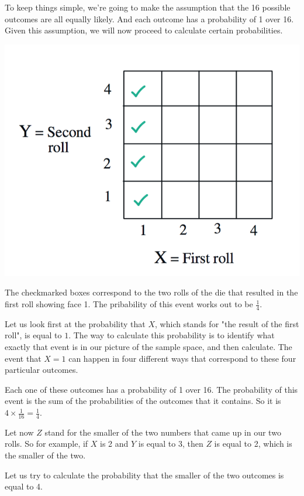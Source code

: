 \documentclass{tufte-handout}
\begin{document}
To keep things simple, we're going to make the assumption that the 16 possible outcomes are all
equally likely. And each outcome has a probability of 1 over 16. Given this assumption, we will now
proceed to calculate certain probabilities.

\begin{marginfigure}
  \includegraphics{CheckMarkedDie}
  \caption{The checkmarked boxes correspond to the two rolls of the die that resulted in the first roll showing face 1.  The pribability of this event works out to be $\frac{1}{4}.$}
\end{marginfigure}


Let us look first at the probability that $X$, which stands for "the result of the first roll", is equal to $1$. The way to
calculate this probability is to identify what exactly that event is in our picture of the sample space, and
then calculate. The event that $X = 1$ can happen in four different ways that correspond to these
four particular outcomes.

Each one of these outcomes has a probability of 1 over 16. The probability of this event is the sum of
the probabilities of the outcomes that it contains. So it is $4 \times \frac{1} {16} = \frac{1} {4}.$

\vspace{3.4cm}
Let now $Z$ stand for the smaller of the two numbers that came up in our two rolls. So for example, if $X$ is
2 and $Y$ is equal to 3, then $Z$ is equal to 2, which is the smaller of the two. 

Let us try to calculate the
probability that the smaller of the two outcomes is equal to 4.
\end{document}
